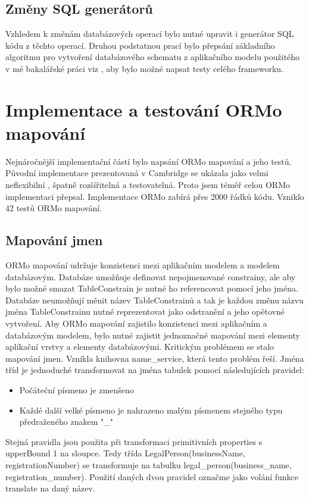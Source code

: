 \documentclass[11pt,twoside,a4paper]{book}
\begin{document}
\FloatBarrier

\subsection{Změny SQL generátorů}
Vzhledem k změnám databázových operací bylo nutné upravit i generátor SQL kódu z
těchto operací. Druhou podstatnou prací bylo přepsání základního algoritmu pro
vytvoření databázového schematu z aplikačního modelu použitého v mé bakalářské
práci viz \cite{Lukes}, aby bylo možné napsat testy celého frameworku.

\section{Implementace a testování ORMo mapování}
Nejnáročnější implementační částí bylo napsání ORMo mapování a jeho testů.
Původní implementace prezentovaná v Cambridge se ukázala jako velmi neflexibilní
, špatně rozšířitelná a testovatelná. Proto jsem téměř celou ORMo implementaci
přepsal. Implementace ORMo zabírá přes 2000 řádků kódu. Vzniklo 42 testů ORMo
mapování.

\subsection{Mapování jmen}\label{subsect:map_translation}
ORMo mapování udržuje konzistenci mezi aplikačním modelem a modelem databázovým.
Databáze umožňuje definovat nepojmenované constrainy, ale aby bylo možné smazat
TableConstrain je nutné ho referencovat pomocí jeho jména. Databáze
neumožňují měnit název TableConstrainů a tak je každou změnu názvu jména
TableConstrainu nutné reprezentovat jako odstranění a jeho opětovné vytvoření.
Aby ORMo mapování zajistilo konzistenci mezi aplikačním a databázovým modelem,
bylo nutné zajistit jednoznačné mapování mezi elementy aplikační vrstvy a
elementy databázovými. Kritickým problémem se stalo mapování jmen. Vznikla
knihovna name\_service, která tento problém řeší. Jména tříd je jednoduché
transformovat na jména tabulek pomocí následujících pravidel:

\begin{itemize}
  \item Počáteční písmeno je zmenšeno
  \item Každé další velké písmeno je nahrazeno malým písmenem stejného typu
  předraženého znakem "\_"
\end{itemize}

Stejná pravidla jsou použita při transformaci primitivních properties s
upperBound 1 na sloupce. Tedy třída LegalPerson(businessName,
registrationNumber) se transformuje na tabulku legal\_person(business\_name,
registration\_number). Použití daných dvou pravidel označme jako volání funkce
translate na daný název.
\end{document}
